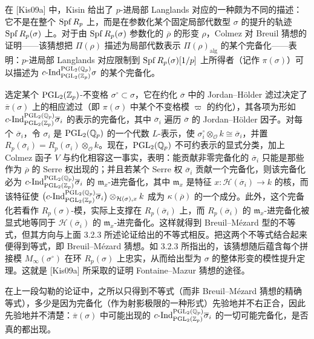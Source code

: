 在 [Kis09a] 中，Kisin 给出了 $p$-进局部 Langlands 对应的一种颇为不同的描述：它不是在整个 $\operatorname{Spf} R_p$ 上，而是在参数化某个固定局部代数型 $\sigma$ 的提升的轨迹 $\operatorname{Spf} R_p(\sigma)$ 上。对于由 $\operatorname{Spf} R_p(\sigma)$ 参数化的 $\overline{\rho}$ 的形变 $\rho$，Colmez 对 Breuil 猜想的证明——该猜想把 $\Pi(\rho)$ 描述为局部代数表示 $\Pi(\rho)_{\mathrm{alg}}$ 的某个完备化——表明：$p$-进局部 Langlands 对应限制到 $\operatorname{Spf} R_p(\sigma)[1/p]$ 上所得者（记作 $\pi(\sigma)$）可以描述为 $c\text{-}\mathrm{Ind}_{\mathrm{PGL}_2(\mathbb{Z}_p)}^{\mathrm{PGL}_2(\mathbb{Q}_p)}\sigma$ 的某个完备化。

选定某个 $\mathrm{PGL}_2(\mathbb{Z}_p)$-不变格 $\sigma^{\circ}\subset\sigma$，它在约化 $\overline{\sigma}$ 中的 Jordan--Hölder 滤过决定了 $\overline{\pi}(\sigma)$ 上的相应滤过（即 $\pi(\sigma)$ 中某个不变格模 $\varpi$ 的约化），其各项为形如 $c\text{-}\mathrm{Ind}_{\mathrm{PGL}_2(\mathbb{Z}_p)}^{\mathrm{PGL}_2(\mathbb{Q}_p)}\overline{\sigma}_i$ 的表示的完备化，其中 $\overline{\sigma}_i$ 遍历 $\overline{\sigma}$ 的 Jordan--Hölder 因子。对每个 $\overline{\sigma}_i$，令 $\sigma_i$ 是 $\mathrm{PGL}_2(\mathbb{Q}_p)$ 的一个代数 $L$-表示，使 $\sigma_i^{\circ}\otimes_{\mathcal O}k\cong\overline{\sigma}_i$，并置 $R_p(\overline{\sigma}_i)=R_p(\sigma_i)\otimes_{\mathcal O}k$。现在，$\mathrm{PGL}_2(\mathbb{Q}_p)$ 不可约表示的显式分类，加上 Colmez 函子 $V$ 与约化相容这一事实，表明：能贡献非零完备化的 $\overline{\sigma}_i$ 只能是那些作为 $\overline{\rho}$ 的 Serre 权出现的；并且若某个 Serre 权 $\overline{\sigma}_i$ 贡献一个完备化，则该完备化必为 $c\text{-}\mathrm{Ind}_{\mathrm{PGL}_2(\mathbb{Z}_p)}^{\mathrm{PGL}_2(\mathbb{Q}_p)}\overline{\sigma}_i$ 的 $\mathfrak m_x$-进完备化，其中 $\mathfrak m_x$ 是特征 $x:\mathcal H(\overline{\sigma}_i)\to k$ 的核，而该特征使 $\bigl(c\text{-}\mathrm{Ind}_{\mathrm{PGL}_2(\mathbb{Z}_p)}^{\mathrm{PGL}_2(\mathbb{Q}_p)}\overline{\sigma}_i\bigr)\otimes_{\mathcal H(\sigma),x}k$ 成为 $\kappa(\overline{\rho})$ 的一个成分。此外，这个完备化若看作 $R_p(\sigma)$-模，实际上支撑在 $R_p(\overline{\sigma}_i)$ 上，而 $R_p(\overline{\sigma}_i)$ 的 $\mathfrak m_x$-进完备化被显式地等同于 $\mathcal H(\overline{\sigma}_i)$ 的 $\mathfrak m_x$-进完备化。这样就得到 Breuil--Mézard 型的不等式，但其方向与上面 3.2.3 所述论证给出的不等式相反。把这两个不等式结合起来便得到等式，即 Breuil--Mézard 猜想。如 3.2.3 所指出的，该猜想随后蕴含每个拼接模 $M_\infty(\sigma^{\circ})$ 在环 $R_p(\sigma)$ 上忠实，从而给出型为 $\sigma$ 的整体形变的模性提升定理。这就是 [Kis09a] 所采取的证明 Fontaine--Mazur 猜想的途径。

在上一段勾勒的论证中，之所以只得到不等式（而非 Breuil--Mézard 猜想的精确等式），多少是因为完备化（作为射影极限的一种形式）先验地并不右正合，因此先验地并不清楚：$\overline{\pi}(\sigma)$ 中可能出现的 $c\text{-}\mathrm{Ind}_{\mathrm{PGL}_2(\mathbb{Z}_p)}^{\mathrm{PGL}_2(\mathbb{Q}_p)}\overline{\sigma}_i$ 的一切可能完备化，是否真的都出现。

